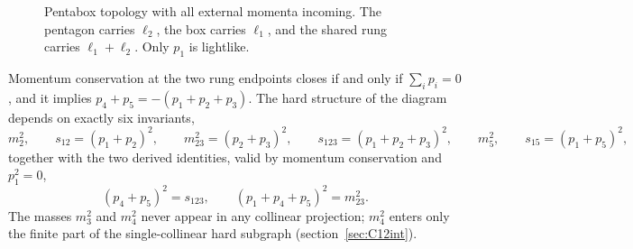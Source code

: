 \documentclass[11pt]{article}
\begin{document}
\begin{figure}[t]
\centering
{}
\caption{Pentabox topology with all external momenta incoming. The pentagon carries $\ell_2$, the
box carries $\ell_1$, and the shared rung carries $\ell_1+\ell_2$. Only $p_1$ is lightlike.}
\label{fig:topo}
\end{figure}

Momentum conservation at the two rung endpoints closes if and only if $\sum_i p_i=0$, and it
implies $p_4+p_5=-(p_1+p_2+p_3)$. The hard structure of the diagram depends on exactly six
invariants,
\begin{equation}
m_2^2,\qquad
s_{12}=(p_1+p_2)^2,\qquad
m_{23}^2=(p_2+p_3)^2,\qquad
s_{123}=(p_1+p_2+p_3)^2,\qquad
m_5^2,\qquad
s_{15}=(p_1+p_5)^2 ,
\label{eq:invariants}
\end{equation}
together with the two derived identities, valid by momentum conservation and $p_1^2=0$,
\begin{equation}
(p_4+p_5)^2=s_{123},
\qquad
(p_1+p_4+p_5)^2=m_{23}^2 .
\label{eq:mcid}
\end{equation}
The masses $m_3^2$ and $m_4^2$ never appear in any collinear projection; $m_4^2$ enters only the
finite part of the single-collinear hard subgraph (section~\ref{sec:C12int}).
\end{document}
